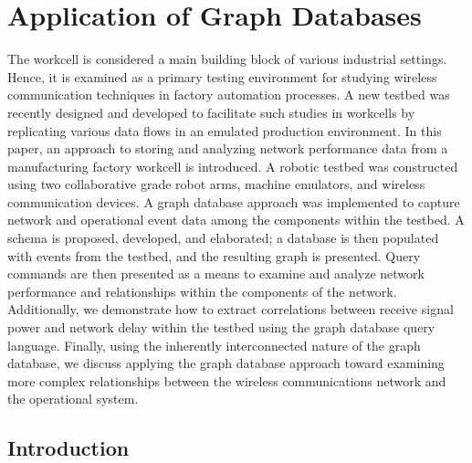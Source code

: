 
\chapter{Application of Graph Databases}

The workcell is considered a main building block of various industrial settings. Hence, it is examined as a primary testing environment for studying wireless communication techniques in factory automation processes. A new testbed was recently designed and developed to facilitate such studies in workcells by replicating various data flows in an emulated production environment. In this paper, an approach to storing and analyzing network performance data from a manufacturing factory workcell is introduced.  A robotic testbed was constructed using two collaborative grade robot arms, machine emulators, and wireless communication devices. A graph database approach was implemented to capture network and operational event data among the components within the testbed.  A schema is proposed, developed, and elaborated; a database is then populated with events from the testbed, and the resulting graph is presented. Query commands are then presented as a means to examine and analyze network performance and relationships within the components of the network.  Additionally, we demonstrate how to extract correlations between receive signal power and network delay within the testbed using the graph database query language.  Finally, using the inherently interconnected nature of the graph database, we discuss applying the graph database approach toward examining more complex relationships between the wireless communications network and the operational system.

\section{Introduction} \label{gdbappl:sec::intro}

